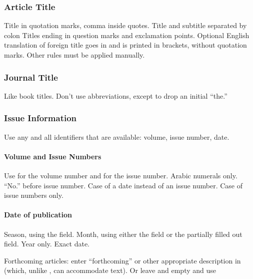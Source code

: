 \documentclass{ltxdockit}[2010/02/12]
\begin{document}
\subsubsection{Article Title}

Title in quotation marks, comma inside quotes.\autocites[][]{1451}
Title and subtitle separated by colon\autocites[][]{2474}
Titles ending in question marks and exclamation points.\autocites[][]{1291, 2070} 
Optional English translation of foreign title goes in  and is printed in brackets, without quotation marks.\autocites[][]{hofer2001konrad-lorenz-a}
Other rules must be applied manually.

\subsubsection{Journal Title}
Like book titles. Don't use abbreviations, except to drop an initial ``the.''

\subsubsection{Issue Information}
Use any and all identifiers that are available: volume, issue number, date.

\paragraph{Volume and Issue Numbers}
Use  for the volume number and  for the issue number. Arabic numerals only. ``No.'' before issue number.\autocites[][]{hodge1992darwins-argumen}
Case of a date instead of an issue number.\autocites[][]{cook2007ius-first-female-journal}
Case of issue numbers only.\autocites[][]{cook2007ius-first-female-novol}

\paragraph{Date of publication}

Season, using the  field.\autocites[][]{haldane1964a-defense-of-be} Month, using either the  field or the partially filled out  field.\autocites[][]{cook2007ius-first-female-journal} Year only.\autocites[][]{hodge1992darwins-argumen} Exact date.\autocites[][]{cook2007ius-first-female-date} 

Forthcoming articles: enter \enquote{forthcoming} or other appropriate description in   (which, unlike , can accommodate text).\autocites[][]{ekholm2008harvey} Or leave  and  empty and use 
\end{document}
